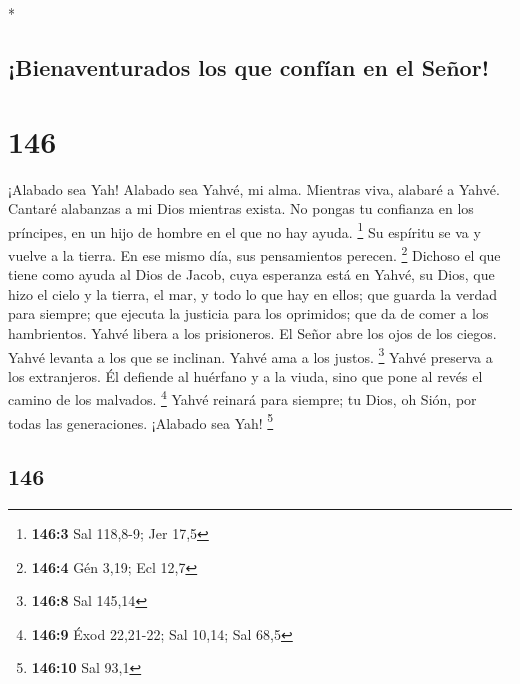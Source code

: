 \begin{paracol}{2}
\begin{otherlanguage}{english}
\end{otherlanguage}

\switchcolumn[0]*

\hypertarget{bienaventurados-los-que-confuxedan-en-el-seuxf1or}{%
\subsection{¡Bienaventurados los que confían en el
Señor!}\label{bienaventurados-los-que-confuxedan-en-el-seuxf1or}}

\hypertarget{section-290}{%
\section{146}\label{section-290}}

 ¡Alabado sea Yah! Alabado sea Yahvé, mi alma.
 Mientras viva, alabaré a Yahvé. Cantaré alabanzas a mi
Dios mientras exista.  No pongas tu confianza en los
príncipes, en un hijo de hombre en el que no hay ayuda. \footnote{\textbf{146:3}
  Sal 118,8-9; Jer 17,5}  Su espíritu se va y vuelve a la
tierra. En ese mismo día, sus pensamientos perecen. \footnote{\textbf{146:4}
  Gén 3,19; Ecl 12,7}  Dichoso el que tiene como ayuda al
Dios de Jacob, cuya esperanza está en Yahvé, su Dios,  que
hizo el cielo y la tierra, el mar, y todo lo que hay en ellos; que
guarda la verdad para siempre;  que ejecuta la justicia
para los oprimidos; que da de comer a los hambrientos. Yahvé libera a
los prisioneros.  El Señor abre los ojos de los ciegos.
Yahvé levanta a los que se inclinan. Yahvé ama a los justos. \footnote{\textbf{146:8}
  Sal 145,14}  Yahvé preserva a los extranjeros. Él
defiende al huérfano y a la viuda, sino que pone al revés el camino de
los malvados. \footnote{\textbf{146:9} Éxod 22,21-22; Sal 10,14; Sal
  68,5}  Yahvé reinará para siempre; tu Dios, oh Sión,
por todas las generaciones. ¡Alabado sea Yah! \footnote{\textbf{146:10}
  Sal 93,1}

\switchcolumn
\begin{otherlanguage}{english}

\hypertarget{section-291}{%
\section{146}\label{section-291}}


\end{otherlanguage}
\end{paracol}

